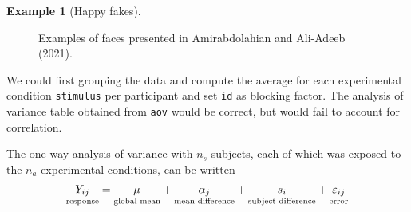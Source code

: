 \documentclass[
  11pt,
  letterpaper,
]{scrbook}
\theoremstyle{definition}
\theoremstyle{definition}
\newtheorem{example}{Example}[chapter]
\theoremstyle{remark}
\begin{document}
\begin{example}[Happy
fakes]
\begin{figure}[ht!]

\begin{minipage}{0.33\linewidth}



\end{minipage}%
%
\begin{minipage}{0.33\linewidth}



\end{minipage}%
%
\begin{minipage}{0.33\linewidth}



\end{minipage}%

\caption{\label{fig-GANfaces}Examples of faces presented in
Amirabdolahian and Ali-Adeeb (2021).}

\end{figure}%

We could first grouping the data and compute the average for each
experimental condition \texttt{stimulus} per participant and set
\texttt{id} as blocking factor. The analysis of variance table obtained
from \texttt{aov} would be correct, but would fail to account for
correlation.

The one-way analysis of variance with \(n_s\) subjects, each of which
was exposed to the \(n_a\) experimental conditions, can be written
\begin{align*}\underset{\text{response}\vphantom{l}}{Y_{ij}} = \underset{\text{global mean}}{\mu_{\vphantom{j}}} + \underset{\text{mean difference}}{\alpha_j} + \underset{\text{subject difference}}{s_{i\vphantom{j}}} + \underset{\text{error}\vphantom{l}}{\varepsilon_{ij}}
\end{align*}


\end{example}
\end{document}
